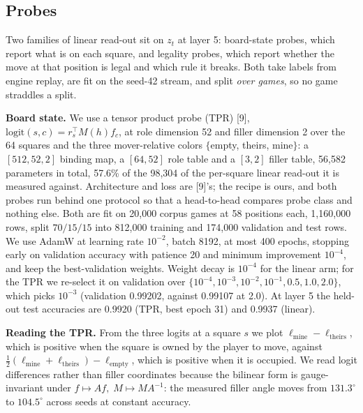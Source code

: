 \documentclass{article}
\begin{document}
\subsection{Probes}

Two families of linear read-out sit on $z_t$ at layer 5: board-state probes, which report what is
on each square, and legality probes, which report whether the move at that position is legal and
which rule it breaks. Both take labels from engine replay, are fit on the seed-42 stream, and
split \emph{over games}, so no game straddles a split.

\textbf{Board state.} We use a tensor product probe (TPR) [9],
$\mathrm{logit}(s, c) = r_s^\top M(h) f_c$, at role dimension 52 and filler dimension 2 over the
64 squares and the three mover-relative colors $\{$empty, theirs, mine$\}$: a $[512, 52, 2]$
binding map, a $[64, 52]$ role table and a $[3, 2]$ filler table, 56,582 parameters in total,
57.6\% of the 98,304 of the per-square linear read-out it is measured against. Architecture and loss are [9]'s; the recipe is ours, and both probes run behind one protocol so
that a head-to-head compares probe class and nothing else. Both are fit on 20,000 corpus games at
58 positions each, 1,160,000 rows, split $70/15/15$ into 812,000 training and 174,000 validation
and test rows. We use AdamW at learning rate $10^{-2}$, batch 8192, at most 400 epochs, stopping
early on validation accuracy with patience 20 and minimum improvement $10^{-4}$, and keep the
best-validation weights. Weight decay is $10^{-4}$ for the linear arm; for the TPR we re-select
it on validation over $\{10^{-4}, 10^{-3}, 10^{-2}, 10^{-1}, 0.5, 1.0, 2.0\}$, which picks
$10^{-3}$ (validation 0.99202, against 0.99107 at 2.0). At layer 5 the held-out test accuracies
are 0.9920 (TPR, best epoch 31) and 0.9937 (linear).

\textbf{Reading the TPR.} From the three logits at a square $s$ we plot $\ell_{\mathrm{mine}} -
\ell_{\mathrm{theirs}}$, which is positive when the square is owned by the player to move, against
$\tfrac{1}{2}(\ell_{\mathrm{mine}} + \ell_{\mathrm{theirs}}) - \ell_{\mathrm{empty}}$, which is positive when
it is occupied. We read logit differences rather than filler coordinates because the bilinear
form is gauge-invariant under $f \mapsto Af,\; M \mapsto MA^{-1}$: the measured filler angle
moves from $131.3^\circ$ to $104.5^\circ$ across seeds at constant accuracy.
\end{document}
